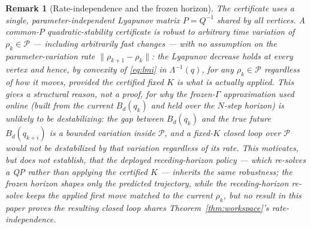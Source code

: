 \documentclass[journal]{IEEEtran}
\newtheorem{remark}{Remark}
\newcommand{\Laminv}{\Lambda^{-1}(q)}
\begin{document}
\begin{remark}[Rate-independence and the frozen horizon]
The certificate uses a \emph{single, parameter-independent} Lyapunov
matrix $P=Q^{-1}$ shared by all vertices. A common-$P$ quadratic-stability
certificate is robust to \emph{arbitrary} time variation of
$\rho_k\in\mathcal P$ --- including arbitrarily fast changes --- with no
assumption on the parameter-variation rate $\|\rho_{k+1}-\rho_k\|$: the
Lyapunov decrease holds at every vertex and hence, by convexity of
\eqref{eq:lmi} in $\Laminv$, for any $\rho_k\in\mathcal P$ regardless of
how it moves, \emph{provided the certified fixed $K$ is what is actually
applied}. This gives a \emph{structural reason}, not a proof, for why the
frozen-$\Gamma$ approximation used online (built from the current
$B_d(q_k)$ and held over the $N$-step horizon) is unlikely to be
destabilizing: the gap between $B_d(q_k)$ and the true future
$B_d(q_{k+i})$ is a bounded variation \emph{inside} $\mathcal P$, and a
fixed-$K$ closed loop over $\mathcal P$ would not be destabilized by that
variation regardless of its rate. This motivates, but does not
establish, that the deployed receding-horizon policy --- which re-solves
a QP rather than applying the certified $K$ --- inherits the same
robustness; the frozen horizon shapes only the \emph{predicted}
trajectory, while the receding-horizon re-solve keeps the
\emph{applied} first move matched to the current $\rho_k$, but no result
in this paper proves the resulting closed loop shares
Theorem~\ref{thm:workspace}'s rate-independence.
\end{remark}
\end{document}
